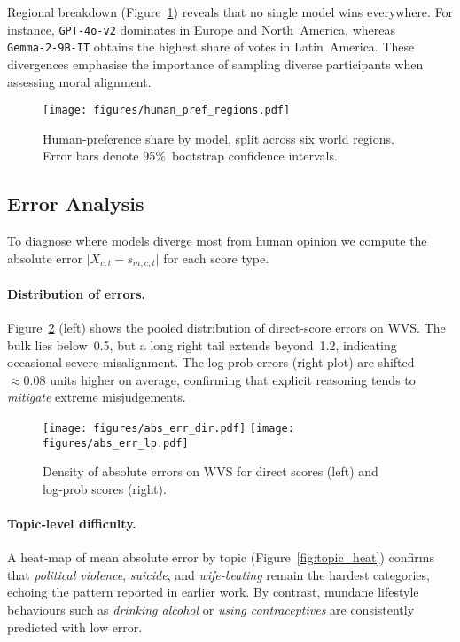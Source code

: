 \documentclass[11pt]{article}
\begin{document}
Regional breakdown (Figure~\ref{fig:human_region}) reveals that no single model
wins everywhere.  For instance, \texttt{GPT‑4o‑v2} dominates in Europe and
North America, whereas \texttt{Gemma‑2‑9B‑IT} obtains the highest share of
votes in Latin America.  These divergences emphasise the importance of sampling
diverse participants when assessing moral alignment.

\begin{figure}[ht]
  \centering
  \texttt{[image: figures/human\_pref\_regions.pdf]}
  \caption{\small Human‑preference share by model, split across six world
  regions.  Error bars denote 95\% bootstrap confidence intervals.}
  \label{fig:human_region}
\end{figure}

\subsection{Error Analysis}
\label{sec:results:error}

To diagnose where models diverge most from human opinion we compute the
absolute error $\lvert X_{c,t}-s_{m,c,t}\rvert$ for each score type.

\paragraph{Distribution of errors.}
Figure~\ref{fig:abs_error_dist_new} (left) shows the pooled distribution of
direct‑score errors on WVS.  The bulk lies below 0.5, but a long right tail
extends beyond 1.2, indicating occasional severe misalignment.  The log‑prob
errors (right plot) are shifted $\approx0.08$ units higher on average,
confirming that explicit reasoning tends to \emph{mitigate} extreme
misjudgements.

\begin{figure}[ht]
  \centering
  \texttt{[image: figures/abs\_err\_dir.pdf]}\hfill
  \texttt{[image: figures/abs\_err\_lp.pdf]}
  \caption{\small Density of absolute errors on WVS for direct scores
  (left) and log‑prob scores (right).}
  \label{fig:abs_error_dist_new}
\end{figure}

\paragraph{Topic‑level difficulty.}
A heat‑map of mean absolute error by topic (Figure~\ref{fig:topic_heat})
confirms that \textit{political violence}, \textit{suicide}, and
\textit{wife‑beating} remain the hardest categories, echoing the pattern
reported in earlier work.  By contrast, mundane lifestyle behaviours such as
\textit{drinking alcohol} or \textit{using contraceptives} are consistently
predicted with low error.
\end{document}
